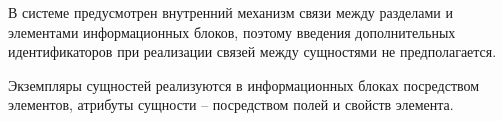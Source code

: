 
В системе предусмотрен внутренний механизм связи между разделами и элементами информационных блоков, поэтому введения дополнительных идентификаторов при реализации связей между сущностями не предполагается.

Экземпляры сущностей реализуются в информационных блоках посредством элементов, атрибуты сущности – посредством полей и свойств элемента. 
